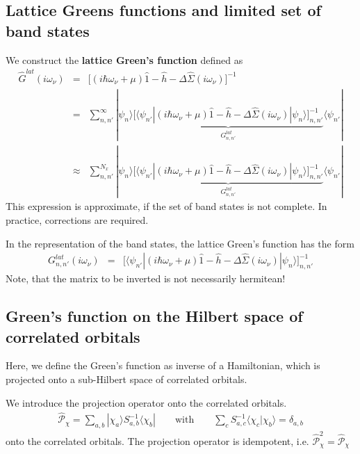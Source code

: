 \documentclass[11pt,a4paper]{report}
\begin{document}
\subsection{Lattice Greens functions and limited set of band states}
We construct the \textbf{lattice Green's function} defined as
\begin{eqnarray}
\hat{G}^{lat}(i\omega_\nu)&=&
\biggl[(i\hbar\omega_\nu+\mu)\hat{1}
-\hat{h}-\Delta\hat{\Sigma}(i\omega_\nu)\biggr]^{-1}
\nonumber\\
&=&\sum_{n,n'}^\infty|\psi_n\rangle
\underbrace{
\biggl[\langle\psi_{n'}|(i\hbar\omega_\nu+\mu)\hat{1}-\hat{h}
-\Delta\hat{\Sigma}(i\omega_\nu)|\psi_n\rangle\biggr]_{n,n'}^{-1}
}_{G^{lat}_{n,n'}}
\langle\psi_{n'}|
\nonumber\\
&\approx&\sum_{n,n'}^{N_x}|\psi_n\rangle
\underbrace{
\biggl[\langle\psi_{n'}|(i\hbar\omega_\nu+\mu)\hat{1}-\hat{h}
-\Delta\hat{\Sigma}(i\omega_\nu)|\psi_n\rangle\biggr]_{n,n'}^{-1}
}_{G^{lat}_{n,n'}}
\langle\psi_{n'}|
\label{eq:latgreenfunc}
\end{eqnarray}
This expression is approximate, if the set of band states is not
complete. In practice, corrections are required.

In the representation of the band states, the lattice Green's function
has the form
\begin{eqnarray}
G^{lat}_{n,n'}(i\omega_\nu)&=&
\biggl[\langle\psi_{n'}|(i\hbar\omega_\nu+\mu)\hat{1}-\hat{h}
-\Delta\hat{\Sigma}(i\omega_\nu)|\psi_n\rangle\biggr]_{n,n'}^{-1}
\label{eq:latgreenfuncmat}
\end{eqnarray}
Note, that the matrix to be inverted is not necessarily hermitean!


\subsection{Green's function on the Hilbert space of correlated orbitals}
Here, we define the Green's function as inverse of a Hamiltonian,
which is projected onto a sub-Hilbert space of correlated
orbitals. 

We introduce the projection operator onto the correlated orbitals.
\begin{eqnarray}
\hat{\mathcal{P}}_\chi=\sum_{a,b}|\chi_a\rangle S^{-1}_{a,b}\langle\chi_b|
\qquad\text{with}\qquad \sum_c S^{-1}_{a,c}\langle\chi_c|\chi_b\rangle=\delta_{a,b}
\end{eqnarray}
onto the correlated orbitals. The projection operator is idempotent,
i.e. $\hat{\mathcal{P}}_\chi^2=\hat{\mathcal{P}}_\chi$
\end{document}
